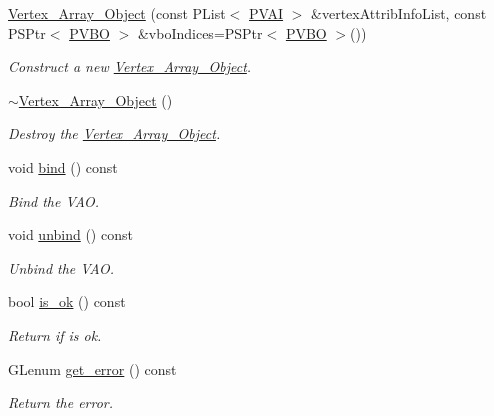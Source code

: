 \begin{DoxyCompactItemize}
\item 
\mbox{\hyperlink{classprz_1_1_vertex___array___object_a83368b8c0aa93db50307df788234cfec}{Vertex\+\_\+\+Array\+\_\+\+Object}} (const P\+List$<$ \mbox{\hyperlink{structprz_1_1_vertex___attribute___information}{P\+V\+AI}} $>$ \&vertex\+Attrib\+Info\+List, const P\+S\+Ptr$<$ \mbox{\hyperlink{classprz_1_1_vertex___buffer___object}{P\+V\+BO}} $>$ \&vbo\+Indices=P\+S\+Ptr$<$ \mbox{\hyperlink{classprz_1_1_vertex___buffer___object}{P\+V\+BO}} $>$())
\begin{DoxyCompactList}\small\item\em Construct a new \mbox{\hyperlink{classprz_1_1_vertex___array___object}{Vertex\+\_\+\+Array\+\_\+\+Object}}. \end{DoxyCompactList}\item 
\mbox{\hyperlink{classprz_1_1_vertex___array___object_a9a9af420f5ea9d334d25d610025b9083}{$\sim$\+Vertex\+\_\+\+Array\+\_\+\+Object}} ()
\begin{DoxyCompactList}\small\item\em Destroy the \mbox{\hyperlink{classprz_1_1_vertex___array___object}{Vertex\+\_\+\+Array\+\_\+\+Object}}. \end{DoxyCompactList}\item 
void \mbox{\hyperlink{classprz_1_1_vertex___array___object_aeb2ecc81c998fd8565786b0a961f9cb7}{bind}} () const
\begin{DoxyCompactList}\small\item\em Bind the V\+AO. \end{DoxyCompactList}\item 
void \mbox{\hyperlink{classprz_1_1_vertex___array___object_a6ca325c80db7f4d570154f776adcc10c}{unbind}} () const
\begin{DoxyCompactList}\small\item\em Unbind the V\+AO. \end{DoxyCompactList}\item 
bool \mbox{\hyperlink{classprz_1_1_vertex___array___object_a75e8fc332c90857ac7435cba9200507c}{is\+\_\+ok}} () const
\begin{DoxyCompactList}\small\item\em Return if is ok. \end{DoxyCompactList}\item 
G\+Lenum \mbox{\hyperlink{classprz_1_1_vertex___array___object_ab13fbca0183040fd87ead81645db9eb2}{get\+\_\+error}} () const
\begin{DoxyCompactList}\small\item\em Return the error. \end{DoxyCompactList}\item 

\end{DoxyCompactItemize}
